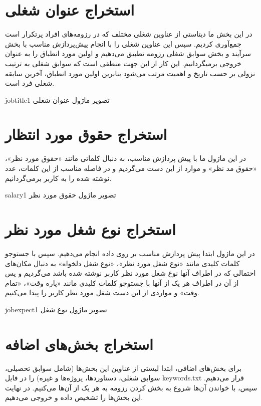 \documentclass{article}
\begin{document}
	\section{استخراج عنوان شغلی}
	
	در این بخش ما دیتاستی از عناوین شغلی مختلف که در رزومه‌های افراد پرتکرار است جمع‌آوری کردیم. سپس این عناوین شغلی را با انجام پیش‌پردازش مناسب با بخش سرآیند و بخش سوابق شغلی رزومه تطبیق می‌دهیم و اولین مورد انطباق را به عنوان خروجی بر‌میگردانیم. این کار از این جهت منطقی است که سوابق شغلی به ترتیب نزولی بر حسب تاریخ و اهمیت مرتب می‌شود بنابرین اولین مورد انطباق،‌ آخرین سابقه شغلی فرد است.
	
	\begin{image}{0.4}{jobtitle}{1}
		تصویر ماژول عنوان شغلی
	\end{image}

	\section{استخراج حقوق مورد انتظار}
	
	در این ماژول ما با پیش پردازش مناسب، به دنبال کلماتی مانند «حقوق مورد نظر»‌، «حقوق مد نظر» و موارد از این دست می‌گردیم و در فاصله مناسب از این کلمات، عدد نوشته شده را به کاربر برمی‌گردانیم.
	
	\begin{image}{0.4}{salary}{1}
		تصویر ماژول حقوق مورد نظر
	\end{image}
	
	
	\section{استخراج نوع شغل مورد نظر}
	
	در این ماژول ابتدا پیش پردازش مناسب بر روی داده انجام می‌دهیم. سپس با جستوجو کلمات کلیدی مانند «نوع شغل مورد نظر»، «نوع شغل دلخواه» به دنبال مکان‌های احتمالی که در اطراف آنها نوع شغل مورد نظر کاربر نوشته شده باشد می‌گردیم و پس از آن در اطراف هر یک از آنها با جستوجو کلمات کلیدی مانند «پاره وقت»، «تمام وقت» و مواردی از این دست شغل مورد نظر کاربر را پیدا می‌کنیم.
	
	\begin{image}{0.4}{jobexpect}{1}
		تصویر ماژول نوع شغل
	\end{image}

	\section{استخراج بخش‌های اضافه}

برای بخش‌های اضافی، ابتدا لیستی از عناوین  این بخش‌ها (شامل سوابق تحصیلی، سوابق شغلی، دستاوردها، پروژه‌ها و غیره) را در فایل keywords.txt قرار می‌دهیم. سپس، با خواندن آن‌ها شروع به بخش کردن رزومه به هر یک از آن‌ها می‌کنیم. در نهایت این بخش‌ها را تشخیص داده و خروجی می‌دهیم.
\end{document}
